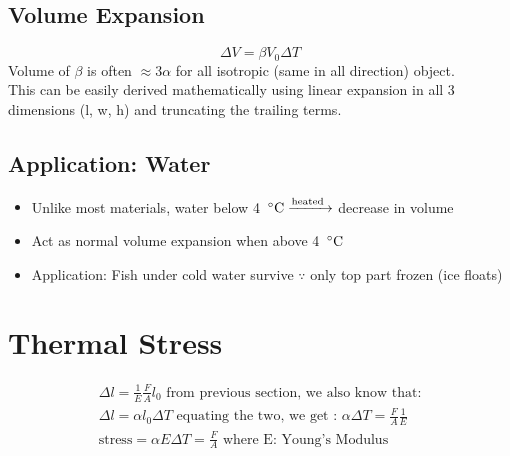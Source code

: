 \documentclass[12 pt , twoside, letterpaper] {article}
\begin{document}
\subsection{Volume Expansion}
$$\Delta V= \beta V_0 \Delta T$$
Volume of $\beta$ is often $\approx 3\alpha$ for all isotropic (same in all direction) object.
\\This can be easily derived mathematically using linear expansion in all 3 dimensions (l, w, h) and truncating the trailing terms.
\subsection{Application: Water}
\begin{itemize}
\item Unlike most materials, water below 4 $\,^{\circ}{\rm C}  \xrightarrow {\text{heated }}$ decrease in volume
\item Act as normal volume expansion when above 4 $\,^{\circ}{\rm C}$
\item Application: Fish under cold water survive $\because$ only top part frozen (ice floats)
\end{itemize}

\section{Thermal Stress}
\begin{align*}
\Delta l=\frac{1}{E} \frac{F}{A}l_0
\text{ from previous section, we also know that:}
\\ \Delta l= \alpha l_0 \Delta T
\text{ equating the two, we get : }
\alpha \Delta T= \frac{F}{A}\frac{1}{E}
\\ \text{stress} =\alpha E \Delta T =\frac{F}{A} \text{  where E: Young's Modulus} 
\end{align*}
\end{document}
